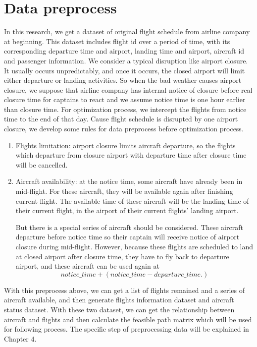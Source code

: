 \documentclass[senior]{IPSstyle}
\begin{document}
\section{Data preprocess}

In this research, we get a dataset of original flight schedule from airline company at beginning.
This dataset includes flight id over a period of time, with its corresponding departure time and airport, landing time and airport, aircraft id and passenger information.
We consider a typical disruption like airport closure. 
It usually occurs unpredictably, and once it occurs, the closed airport will limit either departure or landing activities.
So when the bad weather causes airport closure, we suppose that airline company has internal notice of closure before real closure time for captains to react and we assume notice time is one hour earlier than closure time.
For optimization process, we intercept the flights from notice time to the end of that day.
Cause flight schedule is disrupted by one airport closure, we develop some rules for data preprocess before optimization process.
\begin{enumerate}
    \item Flights limitation: airport closure limits aircraft departure, so the flights which departure from closure airport with departure time after closure time will be cancelled.
    \item Aircraft availability: at the notice time, some aircraft have already been in mid-flight. For these aircraft, they will be available again after finishing current flight. The available time of these aircraft will be the landing time of their current flight, in the airport of their current flights’ landing airport.
    
    But there is a special series of aircraft should be considered. These aircraft departure before notice time so their captain will receive notice of airport closure during mid-flight. However, because these flights are scheduled to land at closed airport after closure time, they have to fly back to departure airport, and these aircraft can be used again at 
    \begin{equation*}
    notice\_time+(notice\_time-departure\_time.)    
    \end{equation*}
\end{enumerate}

With this preprocess above, we can get a list of flights remained and a series of aircraft available, and then generate flights information dataset and aircraft status dataset. With these two dataset, we can get the relationship between aircraft and flights and then calculate the feasible path matrix which will be used for following process. The specific step of preprocessing data will be explained in Chapter 4.
\end{document}

